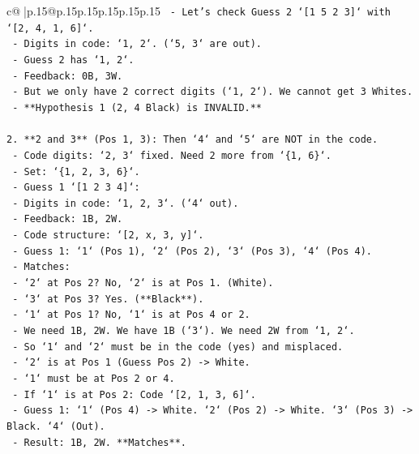 \documentclass{article}
\begin{document}
{\begin{supertabular}{c@{$\;$}|p{.15\linewidth}@{}p{.15\linewidth}p{.15\linewidth}p{.15\linewidth}p{.15\linewidth}p{.15\linewidth}}
{{{\texttt{    {-} Let's check Guess 2 `{[}1 5 2 3{]}` with `{[}2, 4, 1, 6{]}`.} \\
\texttt{        {-} Digits in code: `1, 2`. (`5, 3` are out).} \\
\texttt{        {-} Guess 2 has `1, 2`.} \\
\texttt{        {-} Feedback: 0B, 3W.} \\
\texttt{        {-} But we only have 2 correct digits (`1, 2`). We cannot get 3 Whites.} \\
\texttt{        {-} **Hypothesis 1 (2, 4 Black) is INVALID.**} \\
\\ 
\texttt{2.  **2 and 3** (Pos 1, 3): Then `4` and `5` are NOT in the code.} \\
\texttt{    {-} Code digits: `2, 3` fixed. Need 2 more from `\{1, 6\}`.} \\
\texttt{    {-} Set: `\{1, 2, 3, 6\}`.} \\
\texttt{    {-} Guess 1 `{[}1 2 3 4{]}`:} \\
\texttt{        {-} Digits in code: `1, 2, 3`. (`4` out).} \\
\texttt{        {-} Feedback: 1B, 2W.} \\
\texttt{        {-} Code structure: `{[}2, x, 3, y{]}`.} \\
\texttt{        {-} Guess 1: `1` (Pos 1), `2` (Pos 2), `3` (Pos 3), `4` (Pos 4).} \\
\texttt{        {-} Matches:} \\
\texttt{            {-} `2` at Pos 2? No, `2` is at Pos 1. (White).} \\
\texttt{            {-} `3` at Pos 3? Yes. (**Black**).} \\
\texttt{            {-} `1` at Pos 1? No, `1` is at Pos 4 or 2.} \\
\texttt{        {-} We need 1B, 2W. We have 1B (`3`). We need 2W from `1, 2`.} \\
\texttt{        {-} So `1` and `2` must be in the code (yes) and misplaced.} \\
\texttt{        {-} `2` is at Pos 1 (Guess Pos 2) {-}> White.} \\
\texttt{        {-} `1` must be at Pos 2 or 4.} \\
\texttt{        {-} If `1` is at Pos 2: Code `{[}2, 1, 3, 6{]}`.} \\
\texttt{            {-} Guess 1: `1` (Pos 4) {-}> White. `2` (Pos 2) {-}> White. `3` (Pos 3) {-}> Black. `4` (Out).} \\
\texttt{            {-} Result: 1B, 2W. **Matches**.} \\
}}}
\end{supertabular}}
\end{document}
